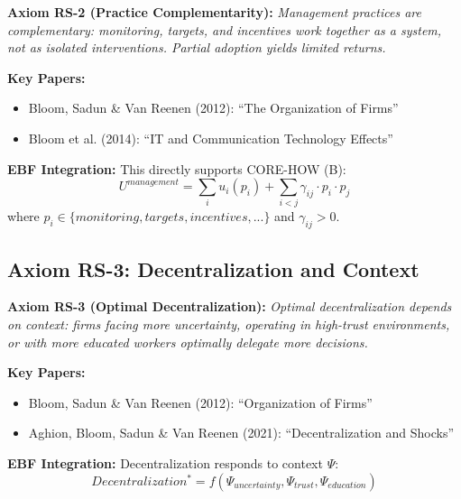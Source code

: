 \begin{tcolorbox}[colback=blue!5!white, colframe=blue!75!black]
\textbf{Axiom RS-2 (Practice Complementarity):}
\textit{Management practices are complementary: monitoring, targets, and
incentives work together as a system, not as isolated interventions.
Partial adoption yields limited returns.}
\end{tcolorbox}

\textbf{Key Papers:}
\begin{itemize}[nosep]
    \item Bloom, Sadun \& Van Reenen (2012): ``The Organization of Firms''
    \item Bloom et al. (2014): ``IT and Communication Technology Effects''
\end{itemize}

\textbf{EBF Integration:}
This directly supports CORE-HOW (B):
\begin{equation}
U^{management} = \sum_i u_i(p_i) + \sum_{i<j} \gamma_{ij} \cdot p_i \cdot p_j
\end{equation}
where $p_i \in \{monitoring, targets, incentives, ...\}$ and $\gamma_{ij} > 0$.

\subsection{Axiom RS-3: Decentralization and Context}

\begin{tcolorbox}[colback=blue!5!white, colframe=blue!75!black]
\textbf{Axiom RS-3 (Optimal Decentralization):}
\textit{Optimal decentralization depends on context: firms facing more
uncertainty, operating in high-trust environments, or with more educated
workers optimally delegate more decisions.}
\end{tcolorbox}

\textbf{Key Papers:}
\begin{itemize}[nosep]
    \item Bloom, Sadun \& Van Reenen (2012): ``Organization of Firms''
    \item Aghion, Bloom, Sadun \& Van Reenen (2021): ``Decentralization and Shocks''
\end{itemize}

\textbf{EBF Integration:}
Decentralization responds to context $\Psi$:
\begin{equation}
Decentralization^* = f(\Psi_{uncertainty}, \Psi_{trust}, \Psi_{education})
\end{equation}

